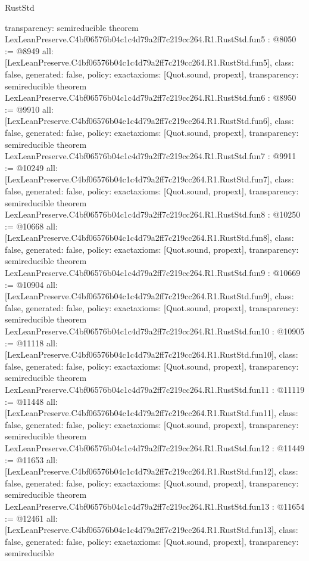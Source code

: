 \begin{lexlean}{RustStd}
\begin{coremodule}
{  transparency: semireducible
}
theorem LexLeanPreserve.C4bf06576b04c1c4d79a2ff7c219cc264.R1.RustStd.fun5 : @8050 := @8949 {
  all: [LexLeanPreserve.C4bf06576b04c1c4d79a2ff7c219cc264.R1.RustStd.fun5],
  class: false,
  generated: false,
  policy: exact{axioms: [Quot.sound, propext]},
  transparency: semireducible
}
theorem LexLeanPreserve.C4bf06576b04c1c4d79a2ff7c219cc264.R1.RustStd.fun6 : @8950 := @9910 {
  all: [LexLeanPreserve.C4bf06576b04c1c4d79a2ff7c219cc264.R1.RustStd.fun6],
  class: false,
  generated: false,
  policy: exact{axioms: [Quot.sound, propext]},
  transparency: semireducible
}
theorem LexLeanPreserve.C4bf06576b04c1c4d79a2ff7c219cc264.R1.RustStd.fun7 : @9911 := @10249 {
  all: [LexLeanPreserve.C4bf06576b04c1c4d79a2ff7c219cc264.R1.RustStd.fun7],
  class: false,
  generated: false,
  policy: exact{axioms: [Quot.sound, propext]},
  transparency: semireducible
}
theorem LexLeanPreserve.C4bf06576b04c1c4d79a2ff7c219cc264.R1.RustStd.fun8 : @10250 := @10668 {
  all: [LexLeanPreserve.C4bf06576b04c1c4d79a2ff7c219cc264.R1.RustStd.fun8],
  class: false,
  generated: false,
  policy: exact{axioms: [Quot.sound, propext]},
  transparency: semireducible
}
theorem LexLeanPreserve.C4bf06576b04c1c4d79a2ff7c219cc264.R1.RustStd.fun9 : @10669 := @10904 {
  all: [LexLeanPreserve.C4bf06576b04c1c4d79a2ff7c219cc264.R1.RustStd.fun9],
  class: false,
  generated: false,
  policy: exact{axioms: [Quot.sound, propext]},
  transparency: semireducible
}
theorem LexLeanPreserve.C4bf06576b04c1c4d79a2ff7c219cc264.R1.RustStd.fun10 : @10905 := @11118 {
  all: [LexLeanPreserve.C4bf06576b04c1c4d79a2ff7c219cc264.R1.RustStd.fun10],
  class: false,
  generated: false,
  policy: exact{axioms: [Quot.sound, propext]},
  transparency: semireducible
}
theorem LexLeanPreserve.C4bf06576b04c1c4d79a2ff7c219cc264.R1.RustStd.fun11 : @11119 := @11448 {
  all: [LexLeanPreserve.C4bf06576b04c1c4d79a2ff7c219cc264.R1.RustStd.fun11],
  class: false,
  generated: false,
  policy: exact{axioms: [Quot.sound, propext]},
  transparency: semireducible
}
theorem LexLeanPreserve.C4bf06576b04c1c4d79a2ff7c219cc264.R1.RustStd.fun12 : @11449 := @11653 {
  all: [LexLeanPreserve.C4bf06576b04c1c4d79a2ff7c219cc264.R1.RustStd.fun12],
  class: false,
  generated: false,
  policy: exact{axioms: [Quot.sound, propext]},
  transparency: semireducible
}
theorem LexLeanPreserve.C4bf06576b04c1c4d79a2ff7c219cc264.R1.RustStd.fun13 : @11654 := @12461 {
  all: [LexLeanPreserve.C4bf06576b04c1c4d79a2ff7c219cc264.R1.RustStd.fun13],
  class: false,
  generated: false,
  policy: exact{axioms: [Quot.sound, propext]},
  transparency: semireducible
}
\end{coremodule}
\end{lexlean}
